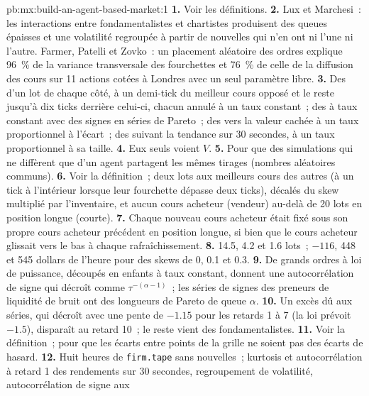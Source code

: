 \begin{solution}{pb:mx:build-an-agent-based-market:1}
\textbf{1.} Voir les définitions.
\textbf{2.} Lux et Marchesi~: les interactions entre fondamentalistes et chartistes produisent des queues épaisses et une volatilité regroupée à partir de nouvelles qui n'en ont ni l'une ni l'autre.
Farmer, Patelli et Zovko~: un placement aléatoire des ordres explique 96~\% de la variance transversale des fourchettes et 76~\% de celle de la diffusion des cours sur 11
actions cotées à Londres avec un seul paramètre libre.
\textbf{3.} Des  d'un lot de chaque côté, à un demi-tick du meilleur cours opposé et le reste jusqu'à dix ticks derrière celui-ci, chacun annulé à un
taux constant~; des  à taux constant avec des signes en séries de Pareto~; des  vers la valeur cachée à un taux proportionnel à l'écart~;
des  suivant la tendance sur 30 secondes, à un taux proportionnel à sa taille.
\textbf{4.} Eux seuls voient $V$.
\textbf{5.} Pour que des simulations qui ne diffèrent que d'un agent partagent les mêmes tirages (nombres aléatoires communs).
\textbf{6.} Voir la définition~; deux lots aux meilleurs cours des autres (à un tick à l'intérieur lorsque leur fourchette dépasse deux ticks), décalés du skew multiplié par
l'inventaire, et aucun cours acheteur (vendeur) au-delà de 20 lots en position longue (courte).
\textbf{7.} Chaque nouveau cours acheteur était fixé sous son propre cours acheteur précédent en position longue, si bien que le cours acheteur glissait vers le bas à chaque rafraîchissement.
\textbf{8.} 14.5, 4.2 et 1.6 lots~; $-116$, 448 et 545 dollars de l'heure pour des skews de 0, 0.1 et 0.3.
\textbf{9.} De grands ordres à loi de puissance, découpés en enfants à taux constant, donnent une autocorrélation de signe qui décroît comme $\tau^{-(\alpha-1)}$~; les séries de signes des preneurs de liquidité de bruit
ont des longueurs de Pareto de queue $\alpha$.
\textbf{10.} Un excès dû aux séries, qui décroît avec une pente de $-1.15$ pour les retards 1 à 7 (la loi prévoit $-1.5$), disparaît au retard 10~; le reste vient des
fondamentalistes.
\textbf{11.} Voir la définition~; pour que les écarts entre points de la grille ne soient pas des écarts de hasard.
\textbf{12.} Huit heures de \texttt{firm.tape} sans nouvelles~; kurtosis et autocorrélation à retard 1 des rendements sur 30 secondes, regroupement de volatilité, autocorrélation de signe aux

\end{solution}
